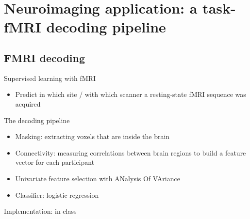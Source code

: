 \documentclass[presentation,mathserif,table]{beamer}
\begin{document}
\section{Neuroimaging application: a task-fMRI decoding pipeline}
\label{sec:org70ff02b}
\subsection{FMRI decoding}
\label{sec:orgbfdd4a5}
\begin{frame}[label={sec:org288dcba}]{Supervised learning with fMRI}
\begin{itemize}
\item Predict in which site / with which scanner a resting-state fMRI sequence was acquired
\end{itemize}
\end{frame}
\begin{frame}[label={sec:orgf27236a}]{The decoding pipeline}
\begin{itemize}
\item Masking: extracting voxels that are inside the brain
\item Connectivity: measuring correlations between brain regions to build a feature vector for each participant
\item Univariate feature selection with ANalysis Of VAriance
\item Classifier: logistic regression
\end{itemize}
\end{frame}
\begin{frame}[label={sec:org3fb75f3}]{Implementation: in class}
\end{frame}
\end{document}
